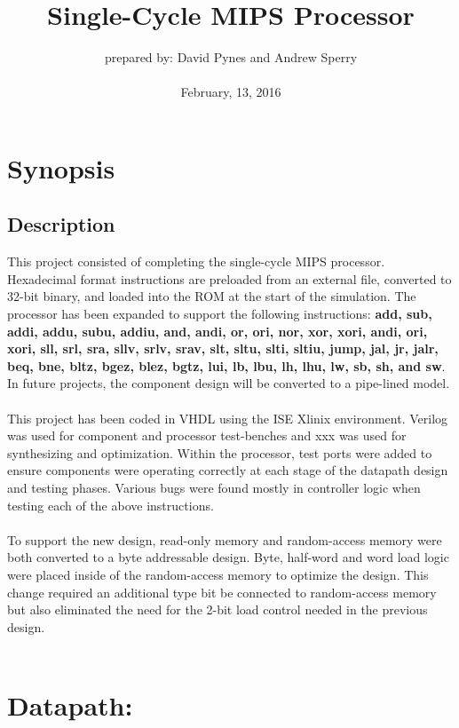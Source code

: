 \documentclass{article}
\begin{document}
\title{Single-Cycle MIPS Processor}
\author{prepared by: David Pynes and Andrew Sperry \\ \\  
{February, 13, 2016}}


\date{}
\maketitle


\section{Synopsis}
 
	\subsection{Description}
		This project consisted of completing the single-cycle MIPS processor. Hexadecimal format instructions are preloaded from an external file, converted to 32-bit binary, and loaded into the ROM at the start of the simulation. The processor has been expanded to support the following instructions: \textbf{add, sub, addi, addu, subu, addiu, and, andi, or, ori, nor, xor, xori, andi, ori, xori, sll, srl, sra, sllv, srlv, srav, slt, sltu, slti, sltiu, jump, jal, jr, jalr, beq, bne, bltz, bgez, blez, bgtz, lui, lb, lbu, lh, lhu, lw, sb, sh, and sw}. In future projects, the component design will be converted to a pipe-lined model.\\ \\ 
	This project has been coded in VHDL using the ISE Xlinix environment. Verilog was used for component and processor test-benches and xxx was used for synthesizing and optimization. Within the processor, test ports were added to ensure components were operating correctly at each stage of the datapath design and testing phases. Various bugs were found mostly in controller logic when testing each of the above instructions.  \\ \\
	To support the new design, read-only memory and random-access memory were both converted to a byte addressable design. Byte, half-word and word load logic were placed inside of the random-access memory to optimize the design. This change required an additional type bit be connected to random-access memory but also eliminated the need for the 2-bit load control needed in the previous design. \\ \\
	\section{Datapath:}
	
\end{document}
